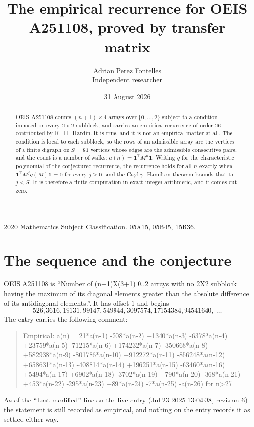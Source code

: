 \documentclass[11pt,a4paper]{article}
\title{The empirical recurrence for OEIS A251108, proved by transfer matrix}
\author{Adrian Perez Fontelles\\ \small Independent researcher}
\date{31 August 2026}
\theoremstyle{plain}
\theoremstyle{definition}
\begin{document}
\maketitle

\begin{abstract}
OEIS A251108 counts $(n+1)\times4$ arrays over $\{0,\dots,2\}$ subject to a condition imposed on
every $2\times2$ subblock, and carries an empirical recurrence of order $26$ contributed
by R.~H.~Hardin. It is true, and it is not an empirical matter at all. The condition is local
to each subblock, so the rows of an admissible array are the vertices of a finite digraph
on $S=81$ vertices whose edges are the admissible consecutive pairs, and the count is a
number of walks: $a(n)=\mathbf{1}^{\!\top}M^{n}\mathbf{1}$. Writing $q$
for the characteristic polynomial of the conjectured recurrence, the recurrence holds for all
$n$ exactly when $\mathbf{1}^{\!\top}M^{j}q(M)\mathbf{1}=0$ for every $j\ge0$, and the
Cayley--Hamilton theorem bounds that to $j<S$. It is therefore a finite computation in exact
integer arithmetic, and it comes out zero.
\end{abstract}

\noindent\small 2020 Mathematics Subject Classification. 05A15, 05B45, 15B36.\normalsize

\section{The sequence and the conjecture}

OEIS A251108 is ``Number of (n+1)X(3+1) 0..2 arrays with no 2X2 subblock having the maximum of its diagonal elements greater than the absolute difference of its antidiagonal elements.''. It has offset $1$ and begins
\[
526, 3616, 19131, 99147, 549944, 3097574, 17154384, 94541640,\ \dots
\]
The entry carries the following comment:
\begin{quote}\small
Empirical: a(n) = 21*a(n-1) -208*a(n-2) +1340*a(n-3) -6378*a(n-4) +23759*a(n-5) -71215*a(n-6) +174232*a(n-7) -350668*a(n-8) +582938*a(n-9) -801786*a(n-10) +912272*a(n-11) -856248*a(n-12) +658631*a(n-13) -408814*a(n-14) +196251*a(n-15) -63460*a(n-16) +5494*a(n-17) +6902*a(n-18) -3702*a(n-19) +790*a(n-20) -368*a(n-21) +453*a(n-22) -295*a(n-23) +89*a(n-24) -7*a(n-25) -a(n-26) for n>27
\end{quote}
As of the ``Last modified'' line on the live entry (Jul 23 2025 13:04:38, revision 6) the statement is
still recorded as empirical, and nothing on the entry records it as settled either way.
\end{document}
